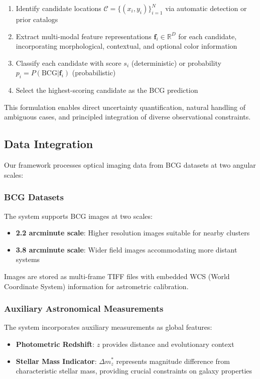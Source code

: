 \documentclass[twocolumn,10pt]{aastex631}
\begin{document}
\begin{enumerate}
\item Identify candidate locations $\mathcal{C} = \{(x_i, y_i)\}_{i=1}^{N}$ via automatic detection or prior catalogs
\item Extract multi-modal feature representations $\mathbf{f}_i \in \mathbb{R}^{D}$ for each candidate, incorporating morphological, contextual, and optional color information
\item Classify each candidate with score $s_i$ (deterministic) or probability $p_i = P(\text{BCG}|\mathbf{f}_i)$ (probabilistic)
\item Select the highest-scoring candidate as the BCG prediction
\end{enumerate}

This formulation enables direct uncertainty quantification, natural handling of ambiguous cases, and principled integration of diverse observational constraints.

\subsection{Data Integration}

Our framework processes optical imaging data from BCG datasets at two angular scales:

\subsubsection{BCG Datasets}
The system supports BCG images at two scales:
\begin{itemize}
\item \textbf{2.2 arcminute scale}: Higher resolution images suitable for nearby clusters
\item \textbf{3.8 arcminute scale}: Wider field images accommodating more distant systems
\end{itemize}

Images are stored as multi-frame TIFF files with embedded WCS (World Coordinate System) information for astrometric calibration.

\subsubsection{Auxiliary Astronomical Measurements}
The system incorporates auxiliary measurements as global features:
\begin{itemize}
\item \textbf{Photometric Redshift}: $z$ provides distance and evolutionary context
\item \textbf{Stellar Mass Indicator}: $\Delta m^*_z$ represents magnitude difference from characteristic stellar mass, providing crucial constraints on galaxy properties
\end{itemize}
\end{document}
